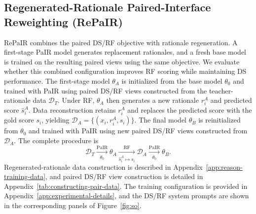 \subsection{Regenerated-Rationale Paired-Interface Reweighting (RePaIR)}

RePaIR combines the paired DS/RF objective with rationale regeneration.
A first-stage PaIR model generates replacement rationales, and a fresh
base model is trained on the resulting paired views using the same
objective. We evaluate whether this combined configuration improves RF
scoring while maintaining DS performance. The first-stage model
\(\theta_A\) is initialized from the base model \(\theta_0\) and
trained with PaIR using paired DS/RF views constructed from the
teacher-rationale data \(\mathcal{D}_T\). Under RF, \(\theta_A\) then
generates a new rationale \(r_i^A\) and predicted score
\(\hat{s}_i^A\). Data reconstruction retains \(r_i^A\) and replaces
the predicted score with the gold score \(s_i\), yielding
\(\mathcal{D}_A=\{(x_i,r_i^A,s_i)\}\). The final model \(\theta_B\)
is reinitialized from \(\theta_0\) and trained with PaIR using new
paired DS/RF views constructed from \(\mathcal{D}_A\). The complete
procedure is
\[
\mathcal{D}_T
\xrightarrow[\theta_0]{\mathrm{PaIR}}
\theta_A
\xrightarrow[\hat{s}_i^A\mapsto s_i]{\mathrm{RF}}
\mathcal{D}_A
\xrightarrow[\theta_0]{\mathrm{PaIR}}
\theta_B .
\]
Regenerated-rationale data construction is described in
Appendix~\ref{app:reason-training-data}, and paired DS/RF view
construction is detailed in Appendix~\ref{tab:constructing-pair-data}.
The training configuration is provided in
Appendix~\ref{app:experimental-details}, and the DS/RF system prompts are
shown in the corresponding panels of Figure~\ref{fig:so}.
